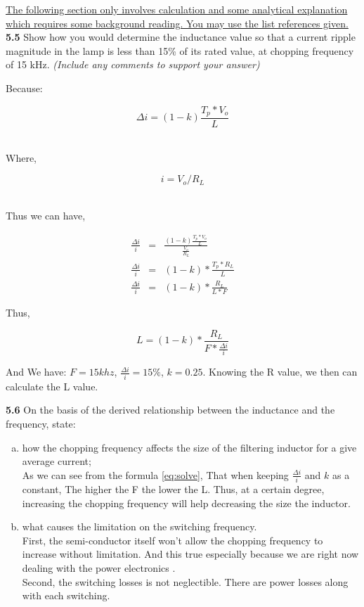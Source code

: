 \documentclass[11pt]{article}
\begin{document}
\ul{The following section only involves calculation and some analytical explanation which requires some background reading. You may use the list references given. }\\

\textbf{5.5}   Show how you would determine the inductance value so that a current ripple magnitude in the lamp is less than 15\% of its rated value, at chopping frequency of 15 kHz. \emph{(Include any comments to support your answer)}

\begin{center}
\begin{flushleft} Because: \end{flushleft}
 
$$\Delta i = (1-k)\frac{T_p*V_o}{L}$$\\
\begin{flushleft} Where, \end{flushleft}
$$i = V_o / R_L$$\\
\begin{flushleft} Thus we can have, \end{flushleft}
\begin{eqnarray*}
\frac{\Delta i}{i} &=& \frac{(1-k)\frac{T_p*V_o}{L}}{\frac{V_o}{R_L}}\\
\frac{\Delta i}{i} &=& (1-k)*\frac{T_p*R_L}{L}\\
\frac{\Delta i}{i} &=& (1-k)*\frac{R_L}{L*F}
\end{eqnarray*}
\begin{flushleft} Thus, \end{flushleft}\begin{equation} \label{eq:solve}
L = (1-k)*\frac{R_L}{F*\frac{\Delta i}{i}}\end{equation}

And We have: $F = 15khz$, $\frac{\Delta i}{i}=15\%$, $k=0.25$. Knowing the R value, we then can calculate the L value.


\end{center}

\textbf{5.6} On the basis of the derived relationship between the inductance and the frequency, state: 
\begin{enumerate}[(a)]
\item how the chopping frequency affects the size of the filtering inductor for a give average current;  \\

As we can see from the formula \ref{eq:solve}, That when keeping $\frac{\Delta i}{i}$ and $k$ as a constant,  The higher the F the lower the L. Thus, at a certain degree, increasing the chopping frequency will help decreasing the size the inductor.
\item what causes the limitation on the switching frequency.\\

First, the semi-conductor itself won't allow the chopping frequency to increase without limitation. And this true especially because we are right now dealing with the power electronics .\\
Second, the switching losses is not neglectible. There are power losses along with each switching.
\end{enumerate}


 
\end{document}
